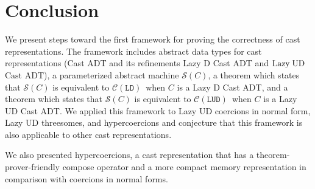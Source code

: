\documentclass[runningheads]{llncs}
\newcommand{\LUD}{\ensuremath{\text{Lazy\;UD}}}
\newcommand{\CastADT}{\ensuremath{\text{Cast ADT}}}
\newcommand{\CMachine}[1]{\ensuremath{\mathcal{C}(#1)}}
\newcommand{\LDMachine}{\CMachine{\BLD}}
\newcommand{\LUDMachine}{\CMachine{\BLUD}}
\newcommand{\SMachine}[1]{\ensuremath{\mathcal{S}(#1)}}
\newcommand{\BLD}[0]{\ensuremath{\mathtt{LD}}}
\newcommand{\BLUD}[0]{\ensuremath{\mathtt{LUD}}}
\begin{document}
\section{Conclusion} \label{sec:conclusion}

We present steps toward the first framework for proving the
correctness of cast representations.
%
The framework includes abstract data types for cast representations
(Cast ADT and its refinements Lazy D Cast ADT and \LUD\ \CastADT), 
a parameterized abstract machine \SMachine{C}, 
a theorem which states that \SMachine{C} is equivalent
to \LDMachine\ when $C$ is a Lazy D Cast ADT, and
a theorem which states that \SMachine{C} is equivalent
to \LUDMachine\ when $C$ is a Lazy UD Cast ADT.
%
%
We applied this framework to Lazy UD coercions in normal form,
Lazy UD threesomes, and hypercoercions and conjecture that
this framework is also applicable to other cast representations.

We also presented hypercoercions, a cast representation that has a 
theorem-prover-friendly compose operator and a more compact memory
representation in comparison with coercions in normal forms.

%
%
%
% 
% 
%
%

{}
\end{document}
